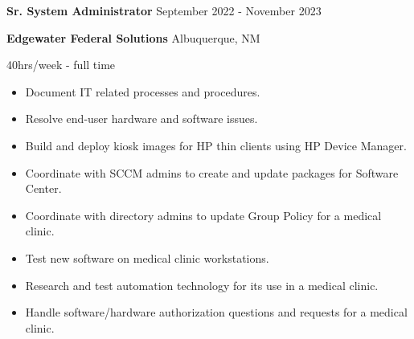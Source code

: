 \documentclass[../main.tex]{subfiles}
\begin{document}
    \textbf{Sr. System Administrator}
    \hfill
    September 2022 - November 2023
    
    \textbf{Edgewater Federal Solutions}
    \hfill
    Albuquerque, NM
    
    \hfill
    40hrs/week - full time
    \begin{itemize}
        \item Document IT related processes and procedures.
        \item Resolve end-user hardware and software issues.
        \item Build and deploy kiosk images for HP thin clients using HP Device Manager.
        \item Coordinate with SCCM admins to create and update packages for Software Center.
        \item Coordinate with directory admins to update Group Policy for a medical clinic.
        \item Test new software on medical clinic workstations.
        \item Research and test automation technology for its use in a medical clinic.
        \item Handle software/hardware authorization questions and requests for a medical clinic.
    \end{itemize}
\end{document}
